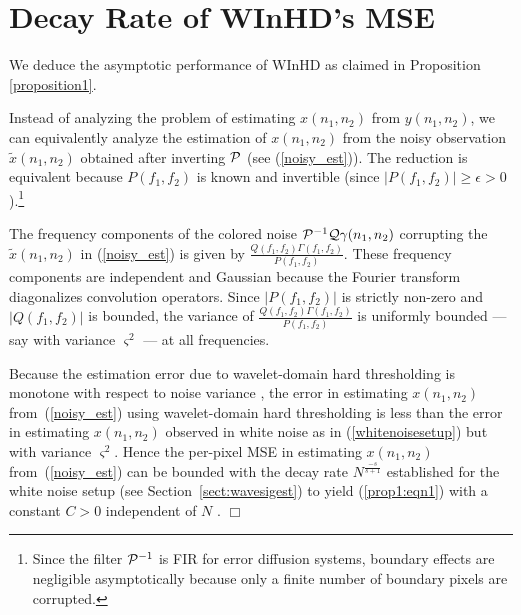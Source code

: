 \documentclass[11pt]{article}
\def\nnnx {n_1}
\def\nnny {n_2}
\def\fffx {f_1}
\def\fffy {f_2}
\def\cP { {\cal{P}} }
\def\cQ { {\cal{Q}} }
\begin{document}
\appendix
\section{Decay Rate of \mbox{WInHD}'s MSE}
\label{app:p1}

We deduce the asymptotic performance of \mbox{WInHD}  as
claimed in Proposition \ref{proposition1}.

Instead of analyzing the problem of estimating $x(\nnnx,\nnny)$ from
$y(\nnnx,\nnny)$, we can equivalently analyze the estimation of
$x(\nnnx,\nnny)$ from the noisy observation
$\widetilde{x}(\nnnx,\nnny)$ obtained after inverting $\cP$ (see
(\ref{noisy_est})). The reduction is equivalent because
$P(\fffx,\fffy)$ is known and invertible (since $|P(\fffx,\fffy)| \ge
\epsilon > 0$).\footnote{Since the filter $\cP^{-1}$ is FIR for error
diffusion systems, boundary effects are negligible asymptotically
because only a finite number of boundary pixels are corrupted.}


The frequency components of the colored noise $\cP^{-1}\cQ
\gamma(\nnnx,\nnny)$ corrupting the $\widetilde{x}(\nnnx,\nnny)$ in
(\ref{noisy_est}) is given by
\mbox{$\frac{Q(\fffx,\fffy)\Gamma(\fffx,\fffy)}{P(\fffx,\fffy)}$}. These
frequency components are independent and Gaussian because the Fourier
transform diagonalizes convolution operators. Since $|P(\fffx,\fffy)|$
is strictly non-zero and $|Q(\fffx,\fffy)|$ is bounded, the variance
of \mbox{$\frac{Q(\fffx,\fffy)\Gamma(\fffx,\fffy)}{P(\fffx,\fffy)}$}
is uniformly bounded --- say with variance $\varsigma^2$ --- at all frequencies.

Because the estimation error due to wavelet-domain hard thresholding
is monotone with respect to noise variance \cite{nonlin-soln-don}, the
error in estimating ${x}(\nnnx,\nnny)$ from~(\ref{noisy_est}) using
wavelet-domain hard thresholding is less than the error in estimating
${x}(\nnnx,\nnny)$ observed in white noise as in
(\ref{whitenoisesetup}) but with variance $\varsigma^2$. Hence the
per-pixel MSE in estimating ${x}(\nnnx,\nnny)$ from~(\ref{noisy_est})
can be bounded with the decay rate $N^{\frac{-s}{s+1}}$ established
for the white noise setup (see Section~\ref{sect:wavesigest}) to yield
(\ref{prop1:eqn1}) with a constant $C > 0$ independent of $N$
\cite{donoho99asymptotic,donoho-minimax}. \hfill$\Box$
\end{document}
